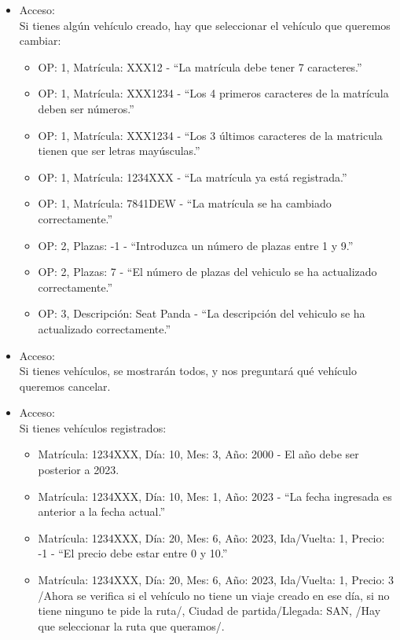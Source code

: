 \begin{itemize}
\begin{itemize}
  \end{itemize}
  \item Acceso:\\
  Si tienes algún vehículo creado, hay que seleccionar el vehículo que queremos cambiar:
  \begin{itemize}
    \item OP: 1, Matrícula: XXX12 - “La matrícula debe tener 7 caracteres.”
    \item OP: 1, Matrícula: XXX1234 - “Los 4 primeros caracteres de la matrícula deben ser números.”
    \item OP: 1, Matrícula: XXX1234 - “Los 3 últimos caracteres de la matricula tienen que ser letras mayúsculas.”
    \item OP: 1, Matrícula: 1234XXX - “La matrícula ya está registrada.”
    \item OP: 1, Matrícula: 7841DEW - “La matrícula se ha cambiado correctamente.”
    \item OP: 2, Plazas: -1 - “Introduzca un número de plazas entre 1 y 9.”
    \item OP: 2, Plazas: 7 - “El número de plazas del vehiculo se ha actualizado correctamente.”
    \item OP: 3, Descripción: Seat Panda - “La descripción del vehiculo se ha actualizado correctamente.”
  \end{itemize}
  \item Acceso:\\
  Si tienes vehículos, se mostrarán todos, y nos preguntará qué vehículo queremos cancelar.\\
  \item Acceso:\\
  Si tienes vehículos registrados:
  \begin{itemize}
    \item Matrícula: 1234XXX, Día: 10, Mes: 3, Año: 2000 - El año debe ser posterior a 2023.
    \item Matrícula: 1234XXX, Día: 10, Mes: 1, Año: 2023 - “La fecha ingresada es anterior a la fecha actual.”
    \item Matrícula: 1234XXX, Día: 20, Mes: 6, Año: 2023, Ida/Vuelta: 1, Precio: -1 - “El precio debe estar entre 0 y 10.”
    \item Matrícula: 1234XXX, Día: 20, Mes: 6, Año: 2023, Ida/Vuelta: 1, Precio: 3 /Ahora se verifica si el vehículo no tiene un viaje creado en ese día,
    si no tiene ninguno te pide la ruta/, Ciudad de partida/Llegada: SAN, /Hay que seleccionar la ruta que queramos/.
  \end{itemize}

\end{itemize}

